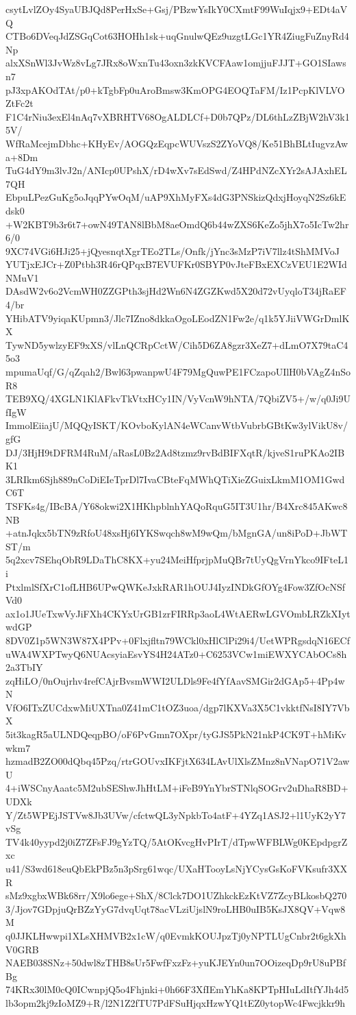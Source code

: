 csytLvlZOy4SyaUBJQd8PerHxSe+Gsj/PBzwYsIkY0CXmtF99WuIqjx9+EDt4aVQ
CTBo6DVeqJdZSGqCot63HOHh1sk+uqGnulwQEz9uzgtLGc1YR4ZiugFuZnyRd4Np
alxXSnWl3JvWz8vLg7JRx8oWxnTu43oxn3zkKVCFAaw1omjjuFJJT+GO1SIawsn7
pJ3xpAKOdTAt/p0+kTgbFp0uAroBmsw3KmOPG4EOQTaFM/Iz1PcpKlVLVOZtFc2t
F1C4rNiu3exEl4nAq7vXBRHTV68OgALDLCf+D0b7QPz/DL6thLzZBjW2hV3k15V/
WfRaMcejmDbhc+KHyEv/AOGQzEqpcWUVszS2ZYoVQ8/Ke51BhBLtIugvzAwa+8Dm
TuG4dY9m3lvJ2n/ANIcp0UPshX/rD4wXv7sEdSwd/Z4HPdNZcXYr2sAJAxhEL7QH
EbpuLPezGuKg5oJqqPYwOqM/uAP9XhMyFXs4dG3PNSkizQdxjHoyqN2Sz6kEdsk0
+W2KBT9b3r6t7+owN49TAN8lBbM8aeOmdQ6b44wZXS6KeZo5jhX7o5IcTw2hr6/0
9XC74VGi6HJi25+jQyesnqtXgrTEo2TLs/Onfk/jYnc3sMzP7iV7llz4tShMMVoJ
YUTjxEJCr+Z0Ptbh3R46rQPqxB7EVUFKr0SBYP0vJteFBxEXCzVEU1E2WIdNMuV1
DAsdW2v6o2VcmWH0ZZGPth3sjHd2Wn6N4ZGZKwd5X20d72vUyqloT34jRaEF4/br
YHibATV9yiqaKUpmn3/Jlc7IZno8dkkaOgoLEodZN1Fw2e/q1k5YJiiVWGrDmlKX
TywND5ywlzyEF9xXS/vlLnQCRpCctW/Cih5D6ZA8gzr3XeZ7+dLmO7X79taC45o3
mpumaUqf/G/qZqah2/Bwl63pwanpwU4F79MgQuwPE1FCzapoUIlH0bVAgZ4nSoR8
TEB9XQ/4XGLN1KlAFkvTkVtxHCy1IN/VyVcnW9hNTA/7QbiZV5+/w/q0Ji9UfIgW
ImmolEiiajU/MQQyISKT/KOvboKylAN4eWCanvWtbVubrbGBtKw3ylVikU8v/gfG
DJ/3HjH9tDFRM4RuM/aRasL0Bz2Ad8tzmz9rvBdBIFXqtR/kjveS1ruPKAo2IBK1
3LRIkm6Sjh889nCoDiEIeTprDl7IvaCBteFqMWhQTiXieZGuixLkmM1OM1GwdC6T
TSFKs4g/IBcBA/Y68okwi2X1HKhpblnhYAQoRquG5IT3U1hr/B4Xrc845AKwc8NB
+atnJqkx5bTN9zRfoU48xsHj6IYKSwqch8wM9wQm/bMgnGA/un8iPoD+JbWTST/m
5q2xcv7SEhqObR9LDaThC8KX+yu24MeiHfprjpMuQBr7tUyQgVrnYkco9IFteL1i
PtxlmlSfXrC1ofLHB6UPwQWKeJxkRAR1hOUJ4IyzINDkGfOYg4Fow3ZfOcNSfVd0
ax1o1JUeTxwVyJiFXh4CKYxUrGB1zrFIRRp3aoL4WtAERwLGVOmbLRZkXIytwdGP
8DV0Z1p5WN3W87X4PPv+0Flxjfltn79WCkl0xHlClPi29i4/UetWPRgsdqN16ECf
uWA4WXPTwyQ6NUAcsyiaEsvYS4H24ATz0+C6253VCw1miEWXYCAbOCs8h2a3TbIY
zqHiLO/0nOujrhv4refCAjrBvsmWWI2ULDls9Fe4fYfAavSMGir2dGAp5+4Pp4wN
VfO6ITxZUCdxwMiUXTna0Z41mC1tOZ3uoa/dgp7lKXVa3X5C1vkktfNsI8IY7VbX
5it3kagR5aULNDQeqpBO/oF6PvGmn7OXpr/tyGJS5PkN21nkP4CK9T+hMiKvwkm7
hzmadB2ZO00dQbq45Pzq/rtrGOUvxIKFjtX634LAvUlXlsZMnz8nVNapO71V2awU
4+iWSCnyAaatc5M2ubSEShwJhHtLM+iFeB9YnYbrSTNlqSOGrv2uDhaR8BD+UDXk
Y/Zt5WPEjJSTVw8Jb3UVw/cfctwQL3yNpkbTo4atF+4YZq1ASJ2+l1UyK2yY7vSg
TV4k40yypd2j0iZ7ZFsFJ9gYzTQ/5AtOKvcgHvPIrT/dTpwWFBLWg0KEpdpgrZxc
u41/S3wd618euQbEkPBz5n3pSrg61wqc/UXaHTooyLsNjYCysGsKoFVKsufr3XXR
sMz9xgbxWBk68rr/X9lo6ege+ShX/8Clck7DO1UZhkckEzKtVZ7ZcyBLkosbQ270
3/Jjov7GDpjuQrBZzYyG7dvqUqt78acVLziUjslN9roLHB0uIB5KsJX8QV+Vqw8M
q0JJKLHwwpi1XLsXHMVB2x1cW/q0EvmkKOUJpzTj0yNPTLUgCnbr2t6gkXhV0GRB
NAEB038SNz+50dwl8zTHB8sUr5FwfFxzFz+yuKJEYn0un7OOizeqDp9rU8uPBfBg
74KRx30lM0cQ0ICwnpjQ5o4Fhjnki+0h66F3XfIEmYhKa8KPTpHIuLdItfYJh4d5
lb3opm2kj9zIoMZ9+R/l2N1Z2fTU7PdFSuHjqxHzwYQ1tEZ0ytopWc4Fwcjkkr9h
